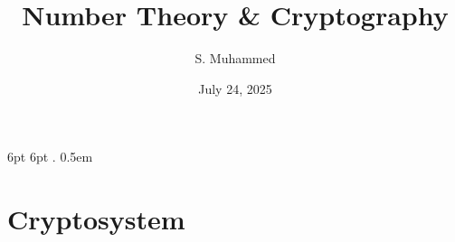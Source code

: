 %
  {6pt}   %
  {6pt}   %
  {\itshape} %
  {} %
  {\bfseries} %
  {.} %
  {0.5em} %
  {} %
\theoremstyle{mystyle}
\newtheorem{definition}{Definition}[section]
\newtheorem{proposition}{Proposition}[section]

\pagestyle{fancy}
\fancyhf{}
\fancyhead[R]{\thepage}

\title{\textbf{\LARGE Number Theory \& Cryptography}}
\author{S. Muhammed}
\date{July 24, 2025}


\maketitle

\section{Cryptosystem}


